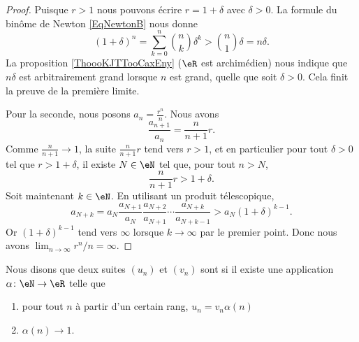 \begin{proof}
	Puisque \( r>1\) nous pouvons écrire \( r=1+\delta\) avec \( \delta>0\). La formule du binôme de Newton \eqref{EqNewtonB} nous donne
	\begin{equation}
		(1+\delta)^n=\sum_{k=0}^n{n\choose k}\delta^k>{n\choose 1}\delta=n\delta.
	\end{equation}
	La proposition \ref{ThoooKJTTooCaxEny} (\( \eR\) est archimédien) nous indique que \( n\delta\) est arbitrairement grand lorsque \( n\) est grand, quelle que soit \( \delta>0\). Cela finit la preuve de la première limite.

	Pour la seconde, nous posons \( a_n=\frac{ r^n }{ n }\). Nous avons
	\begin{equation}
		\frac{ a_{n+1} }{ a_n }=\frac{ n }{ n+1 }r.
	\end{equation}
	Comme \( \frac{ n }{ n+1 }\to 1\), la suite \( \frac{ n }{ n+1 }r\) tend vers \( r>1\), et en particulier pour tout \( \delta>0\) tel que \( r>1+\delta\), il existe \( N\in \eN\) tel que, pour tout \( n > N \),
	\begin{equation}
		\frac{ n }{ n+1 }r>1+\delta.
	\end{equation}
	Soit maintenant \( k\in \eN\). En utilisant un produit télescopique,
	\begin{equation}
		a_{N+k}=a_N\frac{ a_{N+1} }{ a_N }\frac{ a_{N+2} }{ a_{N+1} }\cdots\frac{ a_{N+k} }{ a_{N+k-1} }>a_N(1+\delta)^{k-1}.
	\end{equation}
	Or \( (1+\delta)^{k-1}\) tend vers \( \infty\) lorsque \( k\to \infty\) par le premier point. Donc nous avons \( \lim_{n\to \infty} r^n/n=\infty\).
\end{proof}

\begin{definition}      \label{DEFooEWRTooKgShmT}
	Nous disons que deux suites \( (u_n)\) et \( (v_n)\) sont  si il existe une application \( \alpha\colon \eN\to \eR\) telle que
	\begin{enumerate}
		\item
		      pour tout \( n\) à partir d'un certain rang, \( u_n=v_n\alpha(n)\)
		\item
		      \( \alpha(n)\to 1\).
	\end{enumerate}
\end{definition}




